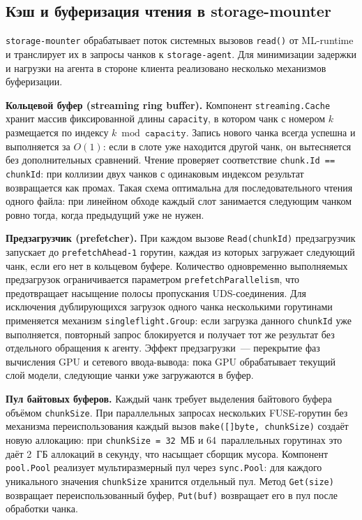 \subsection*{Кэш и буферизация чтения в storage-mounter}

\texttt{storage-mounter} обрабатывает поток системных вызовов \texttt{read()} от ML-runtime и транслирует их в запросы чанков к \texttt{storage-agent}. Для минимизации задержки и нагрузки на агента в стороне клиента реализовано несколько механизмов буферизации.

\textbf{Кольцевой буфер (streaming ring buffer).} Компонент \texttt{streaming.Cache} хранит массив фиксированной длины \texttt{capacity}, в котором чанк с номером $k$ размещается по индексу $k \bmod \mathtt{capacity}$. Запись нового чанка всегда успешна и выполняется за $O(1)$: если в слоте уже находится другой чанк, он вытесняется без дополнительных сравнений. Чтение проверяет соответствие \texttt{chunk.Id == chunkId}: при коллизии двух чанков с одинаковым индексом результат возвращается как промах. Такая схема оптимальна для последовательного чтения одного файла: при линейном обходе каждый слот занимается следующим чанком ровно тогда, когда предыдущий уже не нужен.

\textbf{Предзагрузчик (prefetcher).} При каждом вызове \texttt{Read(chunkId)} предзагрузчик запускает до \texttt{prefetchAhead-1} горутин, каждая из которых загружает следующий чанк, если его нет в кольцевом буфере. Количество одновременно выполняемых предзагрузок ограничивается параметром \texttt{prefetchParallelism}, что предотвращает насыщение полосы пропускания UDS-соединения. Для исключения дублирующихся загрузок одного чанка несколькими горутинами применяется механизм \texttt{singleflight.Group}: если загрузка данного \texttt{chunkId} уже выполняется, повторный запрос блокируется и получает тот же результат без отдельного обращения к агенту. Эффект предзагрузки~--- перекрытие фаз вычисления GPU и сетевого ввода-вывода: пока GPU обрабатывает текущий слой модели, следующие чанки уже загружаются в буфер.

\textbf{Пул байтовых буферов.} Каждый чанк требует выделения байтового буфера объёмом \texttt{chunkSize}. При параллельных запросах нескольких FUSE-горутин без механизма переиспользования каждый вызов \texttt{make([]byte, chunkSize)} создаёт новую аллокацию: при \texttt{chunkSize = 32}~МБ и 64~параллельных горутинах это даёт 2~ГБ аллокаций в секунду, что насыщает сборщик мусора. Компонент \texttt{pool.Pool} реализует мультиразмерный пул через \texttt{sync.Pool}: для каждого уникального значения \texttt{chunkSize} хранится отдельный пул. Метод \texttt{Get(size)} возвращает переиспользованный буфер, \texttt{Put(buf)} возвращает его в пул после обработки чанка.

